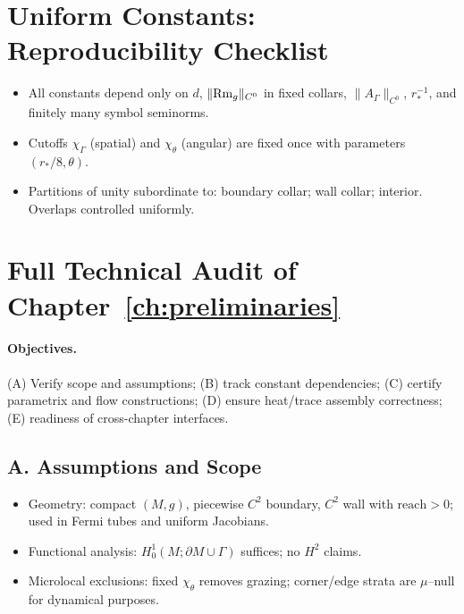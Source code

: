 \section*{Uniform Constants: Reproducibility Checklist}
\begin{itemize}
  \item All constants depend only on $d$, $\|{\rm Rm}_g\|_{C^0}$ in fixed collars, $\|A_\Gamma\|_{C^0}$, $r_*^{-1}$, and finitely many symbol seminorms.
  \item Cutoffs $\chi_\Gamma$ (spatial) and $\chi_\theta$ (angular) are fixed once with parameters $(r_*/8,\theta)$.
  \item Partitions of unity subordinate to: boundary collar; wall collar; interior. Overlaps controlled uniformly.
\end{itemize}

\section*{Full Technical Audit of Chapter~\ref{ch:preliminaries}}

\paragraph{Objectives.}
(A) Verify scope and assumptions; (B) track constant dependencies; (C) certify parametrix and flow constructions; (D) ensure heat/trace assembly correctness; (E) readiness of cross-chapter interfaces.

\subsection*{A. Assumptions and Scope}
\begin{itemize}
  \item Geometry: compact $(M,g)$, piecewise $C^2$ boundary, $C^2$ wall with $\mathrm{reach}>0$; used in Fermi tubes and uniform Jacobians.
  \item Functional analysis: $H^1_0(M;\partial M\cup\Gamma)$ suffices; no $H^2$ claims.
  \item Microlocal exclusions: fixed $\chi_\theta$ removes grazing; corner/edge strata are $\mu$–null for dynamical purposes.
\end{itemize}

